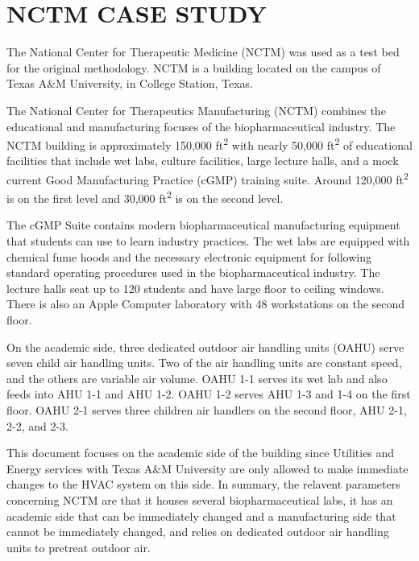 \chapter{\uppercase{NCTM Case Study}}
The National Center for Therapeutic Medicine (NCTM) was used as a test
bed for the original methodology. NCTM is a building located on the
campus of Texas A\&M University, in College Station, Texas. 

The National Center for Therapeutics Manufacturing (NCTM) combines the
educational and manufacturing focuses of the biopharmaceutical industry.
The NCTM building is approximately 150,000 ft\textsuperscript{2} with
nearly 50,000 ft\textsuperscript{2} of educational facilities that
include wet labs, culture facilities, large lecture halls, and a mock
current Good Manufacturing Practice (cGMP) training suite. Around
120,000 ft\textsuperscript{2} is on the first level and 30,000
ft\textsuperscript{2} is on the second level. 

The cGMP Suite contains modern biopharmaceutical manufacturing equipment
that students can use to learn industry practices. The wet labs are
equipped with chemical fume hoods and the necessary electronic equipment
for following standard operating procedures used in the
biopharmaceutical industry. The lecture halls seat up to 120 students
and have large floor to ceiling windows. There is also an Apple Computer
laboratory with 48 workstations on the second floor. 

On the academic side, three dedicated outdoor air handling
units (OAHU) serve seven child air handling units. Two of the air handling
units are constant speed, and the others are variable air volume. OAHU
1-1 serves its wet lab and also feeds into AHU 1-1 and AHU 1-2. OAHU
1-2 serves AHU 1-3 and 1-4 on the first floor. OAHU 2-1 serves three
children air handlers on the second floor, AHU 2-1, 2-2, and 2-3. 

This document focuses on the academic side of the building since
Utilities and Energy services with Texas A\&M University are only
allowed to make immediate changes to the HVAC system on this side. In
summary, the relavent parameters concerning NCTM are that it houses
several biopharmaceutical labs, it has an academic side that can be
immediately changed and a manufacturing side that cannot be immediately
changed, and relies on dedicated outdoor air handling units to pretreat
outdoor air. 



